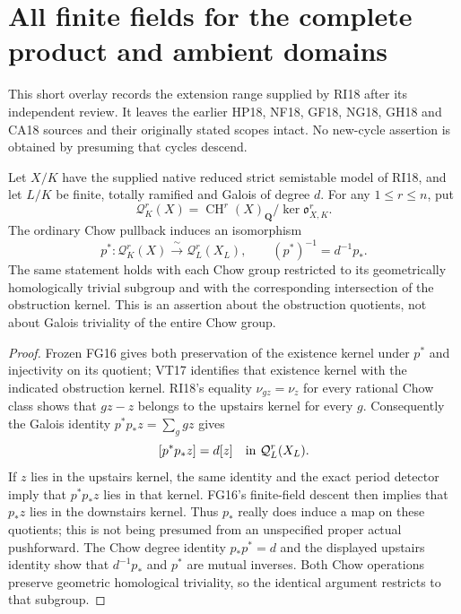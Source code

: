 \section{All finite fields for the complete product and ambient domains}
\label{r18ru:section}

This short overlay records the extension range supplied by RI18 after
its independent review.  It leaves the earlier HP18, NF18, GF18,
NG18, GH18 and CA18 sources and their originally stated scopes intact.
No new-cycle assertion is obtained by presuming that cycles descend.

\begin{corollary}
\label{r18ru:quotient}
Let $X/K$ have the supplied native reduced strict semistable model
of RI18, and let $L/K$ be finite, totally ramified and Galois of
degree $d$.  For any $1\le r\le n$, put
\[
 \mathcal Q_K^r(X)=
 \operatorname{CH}^r(X)_{\mathbf Q}/\ker\mathfrak o_{X,K}^r.
\]
The ordinary Chow pullback induces an isomorphism
\[
 p^*:\mathcal Q_K^r(X)\xrightarrow{\ \sim\ }
            \mathcal Q_L^r(X_L),
       \qquad (p^*)^{-1}=d^{-1}p_* .
 \tag{RU18.0}\label{r18ru:quotient-iso}
\]
The same statement holds with each Chow group restricted to its
geometrically homologically trivial subgroup and with the
corresponding intersection of the obstruction kernel.
This is an assertion about the obstruction quotients, not about
Galois triviality of the entire Chow group.
\end{corollary}

\begin{proof}
Frozen FG16 gives both preservation of the existence kernel under
$p^*$ and injectivity on its quotient; VT17 identifies that existence
kernel with the indicated obstruction kernel.  RI18's equality
$\nu_{g z}=\nu_z$ for every rational Chow class shows that
$g z-z$ belongs to the upstairs kernel for every $g$.
Consequently the Galois identity $p^*p_*z=\sum_g gz$ gives
\[
                [p^*p_*z]=d[z]\quad\hbox{in }\mathcal Q_L^r(X_L).
\]
If $z$ lies in the upstairs kernel, the same identity and the exact
period detector imply that $p^*p_*z$ lies in that kernel.  FG16's
finite-field descent then implies that $p_*z$ lies in the downstairs
kernel.  Thus $p_*$ really does induce a map on these quotients;
this is not being presumed from an unspecified proper actual
pushforward.  The Chow degree identity $p_*p^*=d$ and the displayed
upstairs identity show that $d^{-1}p_*$ and $p^*$ are mutual inverses.
Both Chow operations preserve geometric homological triviality,
so the identical argument restricts to that subgroup.
\end{proof}

